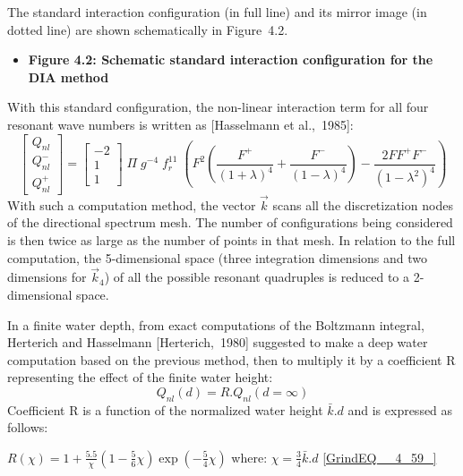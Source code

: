  The standard interaction configuration (in full line) and its mirror image (in dotted line) are shown schematically in Figure~4.2.



\begin{itemize}
\item  \textbf{Figure 4.2: Schematic standard interaction configuration for the DIA method}
\end{itemize}

With this standard configuration, the non-linear interaction term for all four resonant wave numbers is written as [Hasselmann et al.,~1985]:
\begin{equation} \label{GrindEQ__4_57_}
\left[\begin{array}{c} {Q_{nl}^{} } \\ {Q_{nl}^{-} } \\ {Q_{nl}^{+} } \end{array}\right]=\left[\begin{array}{c} {-2} \\ {1} \\ {1} \end{array}\right]\; \Pi \; g^{-4} \; f_{r}^{11} \; \left(F^{2} \left(\frac{F^{+} }{\left(1+\lambda \right)^{4} } +\frac{F^{-} }{\left(1-\lambda \right)^{4} } \right)-\frac{2FF^{+} F^{-} }{\left(1-\lambda ^{2} \right)^{4} } \right)
\end{equation}
With such a computation method, the vector $\vec{k}$ scans all the discretization nodes of the directional spectrum mesh. The number of configurations being considered is then twice as large as the number of points in that mesh. In relation to the full computation, the 5-dimensional space (three integration dimensions and two dimensions for $\vec{k}_{4} $) of all the possible resonant quadruples is reduced to a 2-dimensional space.

 In a finite water depth, from exact computations of the Boltzmann integral, Herterich and Hasselmann [Herterich,~1980] suggested to make a deep water computation based on the previous method, then to multiply it by a coefficient R representing the effect of the finite water height:
\begin{equation} \label{GrindEQ__4_58_}
Q_{nl} (d)=R.Q_{nl} (d=\infty )
\end{equation}
Coefficient R is a function of the normalized water height $\bar{k}.d$ and is expressed as follows:

$R(\chi )=1+\frac{5.5}{\chi } (1-\frac{5}{6} \chi )\exp \left(-\frac{5}{4} \chi \right)$  where: $\chi =\frac{3}{4} \bar{k}.d$ \eqref{GrindEQ__4_59_}

